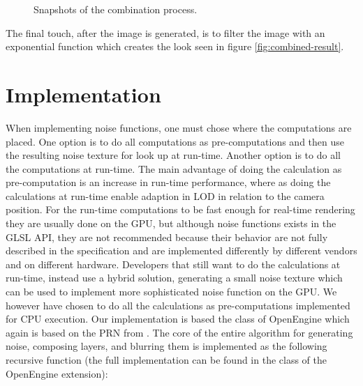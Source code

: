 \begin{figure}[!h]
    \centering
  \hspace{4mm}
  \hspace{4mm}
  \hspace{4mm}
  \caption{Snapshots of the combination process.}
  \label{fig:combined-layers}
\end{figure}

The final touch, after the image is generated, is to filter the image
with an exponential function which creates the look seen in figure
\ref{fig:combined-result}.

\section{Implementation}
When implementing noise functions, one must chose where the
computations are placed. One option is to do all computations as
pre-computations and then use the resulting noise texture for look up
at run-time. Another option is to do all the computations at
run-time. The main advantage of doing the calculation as pre-computation
is an increase in run-time performance, where as doing the calculations
at run-time enable adaption in LOD in relation to the camera
position. For the run-time computations to be fast enough for
real-time rendering they are usually done on the GPU, but although noise
functions exists in the GLSL API,
they are not recommended because
their behavior are not fully described in the specification and are
implemented differently by different vendors and on different
hardware. Developers that still want to do the calculations
at run-time, instead use a hybrid solution, generating a small noise
texture which can be used to implement more sophisticated noise
function on the GPU.
%
We however have chosen to do all the calculations as pre-computations
implemented for CPU execution. Our implementation is based the
 class of OpenEngine which again is based on the
PRN from .
%
The core of the entire algorithm for generating noise, composing
layers, and blurring them is implemented as the following recursive
function (the full implementation can be found in the 
class of the  OpenEngine extension):

